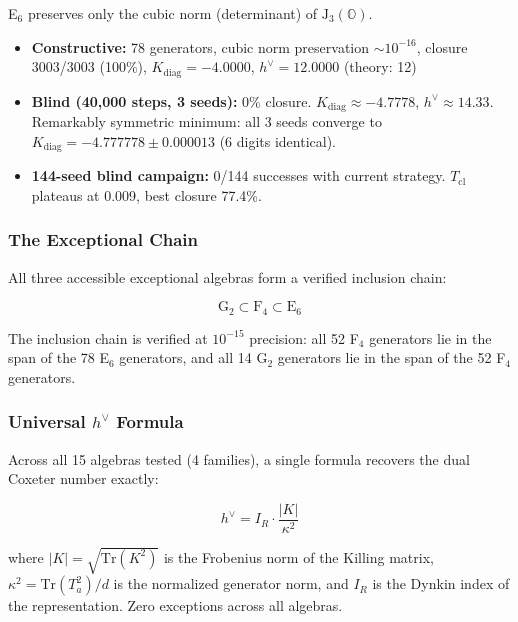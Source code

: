 E$_6$ preserves only the cubic norm (determinant) of $\mathrm{J}_3(\mathbb{O})$.

\begin{itemize}
\item \textbf{Constructive:} 78 generators, cubic norm preservation $\sim 10^{-16}$, closure 3003/3003 (100\%), $K_{\mathrm{diag}} = -4.0000$, $h^\vee = 12.0000$ (theory: 12)
\item \textbf{Blind (40,000 steps, 3 seeds):} 0\% closure. $K_{\mathrm{diag}} \approx -4.7778$, $h^\vee \approx 14.33$. Remarkably symmetric minimum: all 3 seeds converge to $K_{\mathrm{diag}} = -4.777778 \pm 0.000013$ (6 digits identical).
\item \textbf{144-seed blind campaign:} 0/144 successes with current strategy. $T_{\mathrm{cl}}$ plateaus at 0.009, best closure 77.4\%.
\end{itemize}

\subsubsection{The Exceptional Chain}

All three accessible exceptional algebras form a verified inclusion chain:

\begin{equation}
\mathrm{G}_2 \subset \mathrm{F}_4 \subset \mathrm{E}_6
\end{equation}

The inclusion chain is verified at $10^{-15}$ precision: all 52 F$_4$ generators lie in the span of the 78 E$_6$ generators, and all 14 G$_2$ generators lie in the span of the 52 F$_4$ generators.

\subsubsection{Universal $h^\vee$ Formula}

Across all 15 algebras tested (4 families), a single formula recovers the dual Coxeter number exactly:

\begin{equation}
h^\vee = I_R \cdot \frac{|K|}{\kappa^2}
\end{equation}

where $|K| = \sqrt{\mathrm{Tr}(K^2)}$ is the Frobenius norm of the Killing matrix, $\kappa^2 = \mathrm{Tr}(T_a^2)/d$ is the normalized generator norm, and $I_R$ is the Dynkin index of the representation. Zero exceptions across all algebras.

